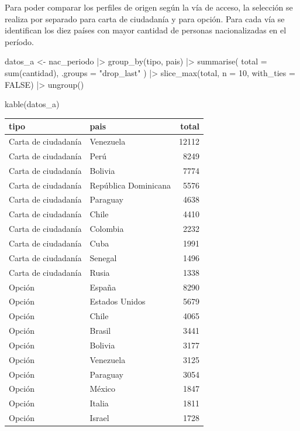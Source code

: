 \documentclass[
  letterpaper,
  DIV=11,
  numbers=noendperiod]{scrartcl}
\newenvironment{Shaded}{\begin{snugshade}}{\end{snugshade}}
\newcommand{\AttributeTok}[1]{\textcolor[rgb]{0.40,0.45,0.13}{#1}}
\newcommand{\ConstantTok}[1]{\textcolor[rgb]{0.56,0.35,0.01}{#1}}
\newcommand{\DecValTok}[1]{\textcolor[rgb]{0.68,0.00,0.00}{#1}}
\newcommand{\FunctionTok}[1]{\textcolor[rgb]{0.28,0.35,0.67}{#1}}
\newcommand{\NormalTok}[1]{\textcolor[rgb]{0.00,0.23,0.31}{#1}}
\newcommand{\OtherTok}[1]{\textcolor[rgb]{0.00,0.23,0.31}{#1}}
\newcommand{\SpecialCharTok}[1]{\textcolor[rgb]{0.37,0.37,0.37}{#1}}
\newcommand{\StringTok}[1]{\textcolor[rgb]{0.13,0.47,0.30}{#1}}
\begin{document}
Para poder comparar los perfiles de origen según la vía de acceso, la
selección se realiza por separado para carta de ciudadanía y para
opción. Para cada vía se identifican los diez países con mayor cantidad
de personas nacionalizadas en el período.

\begin{Shaded}
\begin{Highlighting}[]
\NormalTok{datos\_a }\OtherTok{\textless{}{-}}\NormalTok{ nac\_periodo }\SpecialCharTok{|\textgreater{}}
  \FunctionTok{group\_by}\NormalTok{(tipo, pais) }\SpecialCharTok{|\textgreater{}}
  \FunctionTok{summarise}\NormalTok{(}
    \AttributeTok{total =} \FunctionTok{sum}\NormalTok{(cantidad),}
    \AttributeTok{.groups =} \StringTok{"drop\_last"}
\NormalTok{  ) }\SpecialCharTok{|\textgreater{}}
  \FunctionTok{slice\_max}\NormalTok{(total, }\AttributeTok{n =} \DecValTok{10}\NormalTok{, }\AttributeTok{with\_ties =} \ConstantTok{FALSE}\NormalTok{) }\SpecialCharTok{|\textgreater{}}
  \FunctionTok{ungroup}\NormalTok{()}

\FunctionTok{kable}\NormalTok{(datos\_a)}
\end{Highlighting}
\end{Shaded}

\begin{longtable}[]{@{}llr@{}}
\toprule\noalign{}
tipo & pais & total \\
\midrule\noalign{}
\endhead
\bottomrule\noalign{}
\endlastfoot
Carta de ciudadanía & Venezuela & 12112 \\
Carta de ciudadanía & Perú & 8249 \\
Carta de ciudadanía & Bolivia & 7774 \\
Carta de ciudadanía & República Dominicana & 5576 \\
Carta de ciudadanía & Paraguay & 4638 \\
Carta de ciudadanía & Chile & 4410 \\
Carta de ciudadanía & Colombia & 2232 \\
Carta de ciudadanía & Cuba & 1991 \\
Carta de ciudadanía & Senegal & 1496 \\
Carta de ciudadanía & Rusia & 1338 \\
Opción & España & 8290 \\
Opción & Estados Unidos & 5679 \\
Opción & Chile & 4065 \\
Opción & Brasil & 3441 \\
Opción & Bolivia & 3177 \\
Opción & Venezuela & 3125 \\
Opción & Paraguay & 3054 \\
Opción & México & 1847 \\
Opción & Italia & 1811 \\
Opción & Israel & 1728 \\
\end{longtable}
\end{document}
